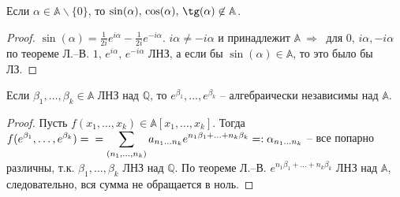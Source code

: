 \begin{corollary} \label{l14_cor4}
	Если $\alpha \in \mathbb{A} \backslash \{ 0 \}$, то $\sin(\alpha),\,\cos(\alpha),\,\tg(\alpha) \not\in \mathbb{A}$.
\end{corollary}
\begin{proof}
	$\sin(\alpha) = \frac{1}{2i}e^{i\alpha}-\frac{1}{2i}e^{-i\alpha}$. $i\alpha \ne -i\alpha$ и принадлежит $\mathbb{A} \ \Rightarrow \ $ для $0,\,i\alpha,-i\alpha$ по теореме Л.--В. 
	$1,\,e^{i\alpha},\,e^{-i\alpha}$ ЛНЗ, а если бы $\sin(\alpha) \in \mathbb{A}$, то это было бы ЛЗ.
\end{proof}

\begin{corollary} \label{l14_cor5}
	Если $\beta_1,\dots,\beta_k \in \mathbb{A}$ ЛНЗ над $\mathbb{Q}$, то $e^{\beta_1},\dots,e^{\beta_k}$ -- алгебраически независимы над $\mathbb{A}$.
\end{corollary}
\begin{proof}
	Пусть $f(x_1,\dots,x_k) \in \mathbb{A}[x_1,\dots,x_k]$. Тогда $\displaystyle f(e^{\beta_1},\dots,e^{\beta_k}) = \\ = \sum\limits_{(n_1,\dots,n_k)} a_{n_1\dots n_k}e^{n_1\beta_1+...+n_k\beta_k} =: \alpha_{n_1\dots n_k}$ -- все попарно различны, т.к. 
	$\beta_1,\dots,\beta_k$ ЛНЗ над $\mathbb{Q}$. По теореме Л.--В. 
	$e^{n_1\beta_1+...+n_k\beta_k}$ ЛНЗ над $\mathbb{A}$, следовательно, вся сумма не обращается в ноль.
\end{proof}